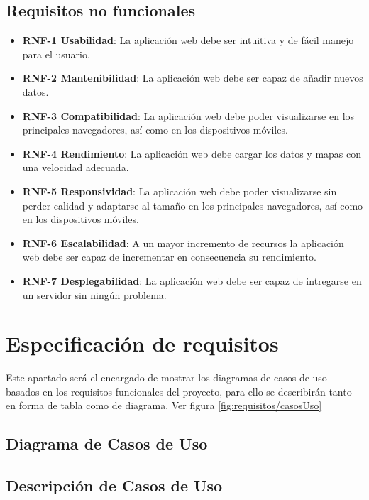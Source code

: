 \subsection{Requisitos no funcionales}
	\begin{itemize}
		\item \textbf{RNF-1 Usabilidad}: La aplicación web debe ser intuitiva y de fácil manejo para el usuario.
		\item \textbf{RNF-2 Mantenibilidad}: La aplicación web debe ser capaz de añadir nuevos datos.
		\item \textbf{RNF-3 Compatibilidad}: La aplicación web debe poder visualizarse en los principales navegadores, así como en los dispositivos móviles.
		\item \textbf{RNF-4 Rendimiento}: La aplicación web debe cargar los datos y mapas con una velocidad adecuada.
		\item \textbf{RNF-5 Responsividad}: La aplicación web debe poder visualizarse sin perder calidad y adaptarse al tamaño en los principales navegadores, así como en los dispositivos móviles. 
		\item \textbf{RNF-6 Escalabilidad}: A un mayor incremento de recursos la aplicación web debe ser capaz de incrementar en consecuencia su rendimiento.
		\item \textbf{RNF-7 Desplegabilidad}: La aplicación web debe ser capaz de intregarse en un servidor sin ningún problema.
	\end{itemize}

\section{Especificación de requisitos}

Este apartado será el encargado de mostrar los diagramas de casos de uso basados en los requisitos funcionales del proyecto, para ello se describirán tanto en forma de tabla como de diagrama. Ver figura \ref{fig:requisitos/casosUso}

\subsection{Diagrama de Casos de Uso}

\subsection{Descripción de Casos de Uso}

